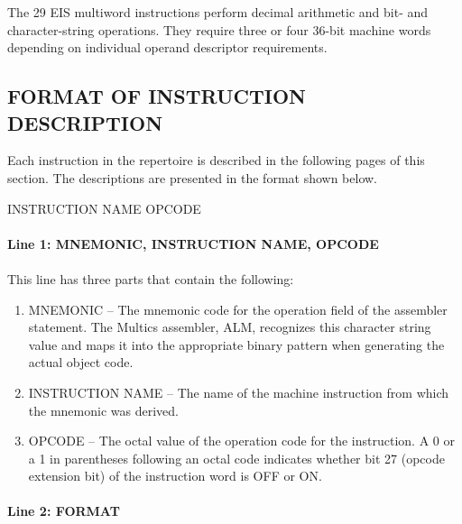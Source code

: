 The 29 EIS multiword instructions perform decimal arithmetic and bit- and
character-string operations. They require three or four 36-bit machine words
depending on individual operand descriptor requirements.  

\subsection{FORMAT OF INSTRUCTION DESCRIPTION}

Each instruction in the repertoire is described in the following pages of this section. The
descriptions are presented in the format shown below.

 {INSTRUCTION NAME} {OPCODE}

\paragraph {Line 1: MNEMONIC, INSTRUCTION NAME, OPCODE}
\paragraph {}

This line has three parts that contain the following:

\begin {enumerate}

\item MNEMONIC -- The mnemonic code for the operation field of the assembler statement.
The Multics assembler, ALM, recognizes this character string value and maps it into the
appropriate binary pattern when generating the actual object code.

\item INSTRUCTION NAME -- The name of the machine instruction from which the mnemonic
was derived.

\item OPCODE -- The octal value of the operation code for the instruction. A 0 or a 1 in
parentheses following an octal code indicates whether bit 27 (opcode extension bit) of
the instruction word is OFF or ON.

\end{enumerate}

\paragraph {Line 2: FORMAT}

